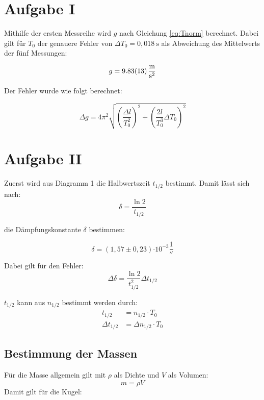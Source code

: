 \section{Aufgabe I}

Mithilfe der ersten Messreihe wird $g$ nach Gleichung \ref{eq:Tnorm} berechnet.
Dabei gilt für $T_0$ der genauere Fehler von $\Delta T_0 = 0,018\ \text{s}$ als Abweichung des Mittelwerts der fünf Messungen:

\[g =\SI{9,83 \pm 0,13 }{\frac{\meter}{\second^2}}\]

Der Fehler wurde wie folgt berechnet:

\begin{equation}
    \Delta g = 4\pi^2 \sqrt{\left(\frac{\Delta l}{T_0^2}\right)^2 + \left(\frac{2l}{T_0^3}\Delta T_0\right)^2}
\end{equation}

\section{Aufgabe II}

Zuerst wird aus Diagramm 1 die Halbwertszeit $t_{1/2}$ bestimmt. Damit lässt sich nach:
\begin{equation}
    \delta = \frac{\ln 2}{t_{1/2}}
\end{equation}

die Dämpfungskonstante $\delta$ bestimmen:

\[ \delta = (1,57 \pm 0,23) \si{\cdot 10^{-3}\frac{1}{\second}}\]

Dabei gilt für den Fehler:
\begin{equation}
    \Delta \delta = \frac{\ln 2}{t_{1/2}^2}\Delta t_{1/2}
\end{equation}

$t_{1/2}$ kann aus $n_{1/2}$ bestimmt werden durch:
\begin{align}
    t_{1/2} &= n_{1/2} \cdot T_0 \\
    \Delta t_{1/2} &= \Delta n_{1/2} \cdot T_0
\end{align}

\subsection{Bestimmung der Massen}

Für die Masse allgemein gilt mit $\rho$ als Dichte und $V$ als Volumen:
\begin{equation}
    m = \rho V
\end{equation}
Damit gilt für die Kugel:

